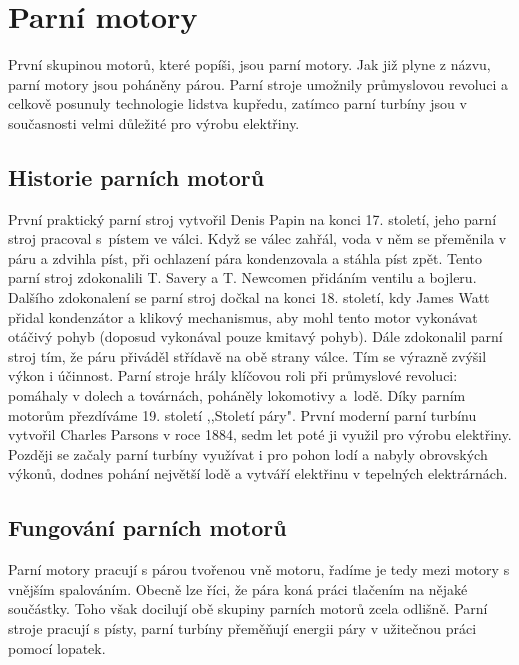\section{Parní motory}
{První skupinou motorů, které popíši, jsou parní motory. Jak již plyne z názvu, parní motory jsou poháněny párou. Parní stroje umožnily průmyslovou revoluci a celkově posunuly technologie lidstva kupředu, zatímco parní turbíny jsou v současnosti velmi důležité pro výrobu elektřiny.}

\subsection{Historie parních motorů}
{První praktický parní stroj vytvořil Denis Papin na konci 17. století, jeho parní stroj pracoval s~pístem ve válci. Když se válec zahřál, voda v něm se přeměnila v páru a zdvihla píst, při ochlazení pára kondenzovala a stáhla píst zpět. Tento parní stroj zdokonalili T. Savery a T. Newcomen přidáním ventilu a bojleru. Dalšího zdokonalení se parní stroj dočkal na konci 18. století, kdy James Watt přidal kondenzátor a klikový mechanismus, aby mohl tento motor vykonávat otáčivý pohyb (doposud vykonával pouze kmitavý pohyb). Dále zdokonalil parní stroj tím, že páru přiváděl střídavě na obě strany válce. Tím se výrazně zvýšil výkon i účinnost. Parní stroje hrály klíčovou roli při průmyslové revoluci: pomáhaly v dolech a továrnách, poháněly lokomotivy a~lodě. Díky parním motorům přezdíváme 19. století ,,Století páry".}
\cite{st:parniStroj}\odst
{První moderní parní turbínu vytvořil Charles Parsons v roce 1884, sedm let poté ji využil pro výrobu elektřiny. Později se začaly parní turbíny využívat i pro pohon lodí a nabyly obrovských výkonů, dodnes pohání největší lodě a vytváří elektřinu v tepelných elektrárnách.}
\cite{SA:SteamTurbines}

\subsection{Fungování parních motorů}
{Parní motory pracují s párou tvořenou vně motoru, řadíme je tedy mezi motory s vnějším spalováním. Obecně lze říci, že pára koná práci tlačením na nějaké součástky. Toho však docilují obě skupiny parních motorů zcela odlišně. Parní stroje pracují s písty, parní turbíny přeměňují energii páry v užitečnou práci pomocí lopatek.}

